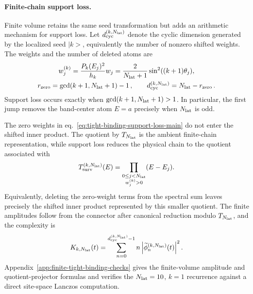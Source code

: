\documentclass[a4paper,11pt]{article}
\def\ket#1{|#1>}%
\theoremstyle{definition}
\theoremstyle{remark}
\newcommand{\ket}[1]{|#1\rangle}
\newcommand{\tphi}{\widetilde\phi}
\begin{document}
\paragraph{Finite-chain support loss.}
Finite volume retains the same seed transformation but adds an arithmetic mechanism for support loss. Let $d_{\rm cyc}^{(k,N_{\rm lat})}$ denote the cyclic dimension generated by the localized seed $\ket{k}$, equivalently the number of nonzero shifted weights. The weights and the number of deleted atoms are 
\begin{equation}
\begin{gathered}
   w_j^{(k)}
   =\frac{P_k(E_j)^2}{h_k}w_j
     =\frac{2}{N_{\rm lat}+1}\sin^2((k+1)\theta_j),\\
   r_{\rm zero}
   =\gcd(k+1,N_{\rm lat}+1)-1\,,
   \qquad d_{\rm cyc}^{(k,N_{\rm lat})}
   =N_{\rm lat}-r_{\rm zero}\,.
\end{gathered}
   \label{eq:tight-binding-support-loss-main}
\end{equation}
Support loss occurs exactly when \(\gcd(k+1,N_{\rm lat}+1)>1\). In particular, the first jump removes the band-center atom $E=a$ precisely when \(N_{\rm lat}\) is odd.

The zero weights in eq.~\eqref{eq:tight-binding-support-loss-main} do not
enter the shifted inner product.  The quotient by \(T_{N_{\rm lat}}\) is
the ambient finite-chain representation, while support loss reduces the
physical chain to the quotient associated with
\begin{equation}
   T_{\rm surv}^{(k,N_{\rm lat})}(E)
   =\prod_{\substack{0\le j<N_{\rm lat}\\ w_j^{(k)}>0}}(E-E_j).
   \label{eq:tight-binding-surviving-support-main}
\end{equation}
Equivalently, deleting the zero-weight terms from the spectral sum leaves
precisely the shifted inner product represented by this smaller quotient.
The finite amplitudes follow from the connector after canonical reduction
modulo \(T_{N_{\rm lat}}\), and the complexity is
\begin{equation}
   K_{k,N_{\rm lat}}(t)
   =\sum_{n=0}^{d_{\rm cyc}^{(k,N_{\rm lat})}-1}
   n\left|\tphi_n^{(k,N_{\rm lat})}(t)\right|^2.
   \label{eq:tight-binding-finite-complexity-main}
\end{equation}
Appendix~\ref{app:finite-tight-binding-checks} gives the finite-volume
amplitude and quotient-projector formulas and verifies the
$N_{\rm lat}=10$, $k=1$ recurrence against a direct site-space Lanczos 
computation.
\end{document}
